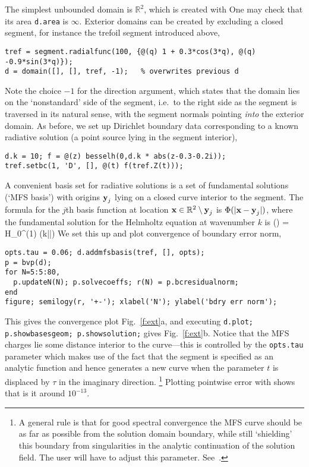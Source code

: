 The simplest unbounded domain is $\mathbb{R}^2$, which is created with
One may check that its area {\tt d.area} is $\infty$.
Exterior domains can be created by excluding a closed segment, for instance
the trefoil segment introduced above,
\begin{verbatim}
tref = segment.radialfunc(100, {@(q) 1 + 0.3*cos(3*q), @(q) -0.9*sin(3*q)});
d = domain([], [], tref, -1);   % overwrites previous d
\end{verbatim}
Note the choice $-1$ for the direction argument, which states that
the domain lies on the `nonstandard' side of the segment, i.e.\
to the right side as the segment is traversed in its natural sense,
with the segment normals pointing {\em into} the exterior domain.
As before, we set up Dirichlet boundary data corresponding to a known
radiative solution (a point source lying in the segment interior),
\begin{verbatim}
d.k = 10; f = @(z) besselh(0,d.k * abs(z-0.3-0.2i));
tref.setbc(1, 'D', [], @(t) f(tref.Z(t))); 
\end{verbatim}
A convenient basis set for radiative solutions is a set of fundamental
solutions (`MFS basis') with origins $\textbf{y}_j$
lying on a closed curve interior to the segment.
The formula for the $j$th basis function at location
$\textbf{x}\in\mathbb{R}^2\setminus \textbf{y}_j$
is $\Phi(|\textbf{x}-\textbf{y}_j|)$, where
the fundamental solution for the Helmholtz equation at wavenumber $k$ is
\be
        \Phi(\bx) = H_0^{(1)} (k|\bx|)
\label{e:fund}
\ee
We set this up and plot convergence of boundary error norm,
\begin{verbatim}
opts.tau = 0.06; d.addmfsbasis(tref, [], opts);
p = bvp(d);
for N=5:5:80,
  p.updateN(N); p.solvecoeffs; r(N) = p.bcresidualnorm;
end
figure; semilogy(r, '+-'); xlabel('N'); ylabel('bdry err norm');
\end{verbatim}
This gives the convergence plot Fig.~\ref{f:ext}a, and
executing {\tt d.plot; p.showbasesgeom; p.showsolution;} gives
Fig.~\ref{f:ext}b. Notice that the MFS charges lie some distance interior
to the curve---this is controlled by the {\tt opts.tau} parameter which
makes use of the fact that the segment is specified as an analytic function
and hence generates a new curve when the parameter $t$ is displaced
by $\tau$ in the imaginary direction.%
  \footnote{A general rule is that for good spectral convergence
    the MFS curve should be
    as far as possible from the solution domain boundary, while still
    `shielding' this boundary from singularities in the analytic continuation
    of the solution field. The user will have to adjust this parameter.
    See~\cite{mfs}.}
Plotting pointwise error with
shows that is it around $10^{-13}$.


